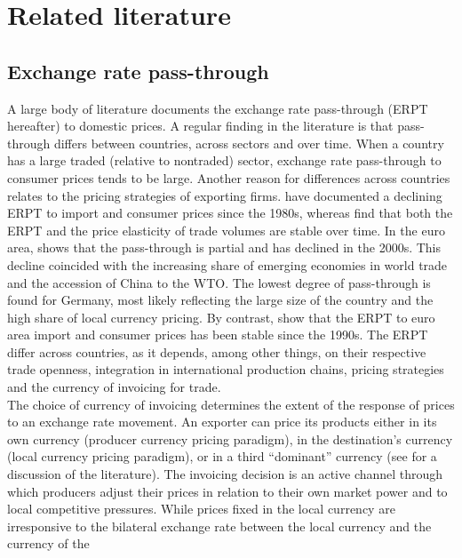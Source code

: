 \documentclass[12pt,a4paper]{paper}
\begin{document}
\label{sec:intro}


\section{Related literature}
\label{sec:lit}

\subsection{Exchange rate pass-through} 
A large body of literature documents the exchange rate pass-through (ERPT hereafter) to domestic prices. 
A regular finding in the literature is that pass-through differs between countries, across sectors and over time. 
When a country has a large traded (relative to nontraded) sector, exchange rate pass-through to consumer prices tends to be large. 
Another reason for differences across countries relates to the pricing strategies of exporting firms.
\cite{Campa2008} have documented a declining ERPT to import and consumer prices since the 1980s, whereas \cite{Leigh2017} find that both the ERPT and the price elasticity of trade volumes are stable over time. 
In the euro area, \cite{Ozyurt2016} shows that the pass-through is partial and has declined in the 2000s. 
This decline coincided with the increasing share of emerging economies in world trade and the accession of China to the WTO. 
The lowest degree of pass-through is found for Germany, most likely reflecting the large size of the country and the high share of local currency pricing.
By contrast, \cite{Ortega2020} show that the ERPT to euro area import and consumer prices has been stable since the 1990s. 
The ERPT differ across countries, as it depends, among other things, on their respective trade openness, integration in international production chains, pricing strategies and the currency of invoicing for trade. \\
The choice of currency of invoicing determines the extent of the response of prices to an exchange rate movement. 
An exporter can price its products either in its own currency (producer currency pricing paradigm), in the destination’s currency (local currency pricing paradigm), or in a third “dominant” currency (see \cite{Ortega2020} for a discussion of the literature). 
The invoicing decision is an active channel through which producers adjust their prices in relation to their own market power and to local competitive pressures.
While prices fixed in the local currency are irresponsive to the bilateral exchange rate between the local currency and the currency of the
\end{document}
